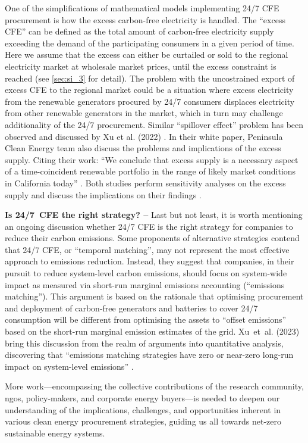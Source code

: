 One of the simplifications of mathematical models implementing 24/7 CFE procurement is how the excess carbon-free electricity is handled. 
The \enquote{excess CFE} can be defined as the total amount of carbon-free electricity supply exceeding the demand of the participating consumers in a given period of time.
Here we assume that the excess can either be curtailed or sold to the regional electricity market at wholesale market prices, until the excess constraint is reached (see \cref{sec:si_3} for detail).
The problem with the uncostrained export of excess CFE to the regional market could be a situation where excess electricity from the renewable generators procured by 24/7 consumers displaces electricity from other renewable generators in the market, which in turn may challenge additionality of the 24/7 procurement. 
Similar \enquote{spillover effect} problem has been observed and discussed by Xu et al. (2022) \cite{xu-247CFE-SSRN}.
In their white paper, Peninsula Clean Energy team also discuss the problems and implications of the excess supply. Citing their work: \enquote{We conclude that excess supply is a necessary aspect of a time-coincident renewable portfolio in the range of likely market conditions in California today} \cite{peninsula-report247}.
Both studies perform sensitivity analyses on the excess supply and discuss the implications on their findings \cite{xu-247CFE-SSRN, peninsula-report247}.

\textbf{Is 24/7~CFE the right strategy? --} Last but not least, it is worth mentioning an ongoing discussion whether 24/7 CFE is the right strategy for companies to reduce their carbon emissions.
Some proponents of alternative strategies contend that 24/7 CFE, or \enquote{temporal matching}, may not represent the most effective approach to emissions reduction. 
Instead, they suggest that companies, in their pursuit to reduce system-level carbon emissions, should focus on system-wide impact as measured via short-run marginal emissions accounting (\enquote{emissions matching}).
This argument is based on the rationale that optimising procurement and deployment of carbon-free generators and batteries to cover 24/7 consumption will be different from optimising the assets to \enquote{offset emissions} based on the short-run marginal emission estimates of the grid.
Xu~et~al. (2023) bring this discussion from the realm of arguments into quantitative analysis, discovering that \enquote{emissions matching strategies have zero or near-zero long-run impact on system-level \co emissions} \cite{princeton-247CFEvsEmissionality}.

More work---encompassing the collective contributions of the research community, \gls{ngo}s, policy-makers, and corporate energy buyers---is needed to deepen our understanding of the implications, challenges, and opportunities inherent in various clean energy procurement strategies, guiding us all towards net-zero sustainable energy systems.